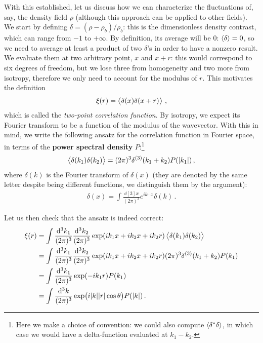 \documentclass[main.tex]{subfiles}
\begin{document}
With this established, let us discuss how we can characterize the fluctuations of, say, the density field \(\rho \) (although this approach can be applied to other fields). 
We start by defining \(\delta = (\rho - \rho_b) / \rho_b\):  this is the dimensionless density contrast, which can range from \(-1\) to \(+ \infty \).
By definition, its average will be 0: \(\expval{ \delta } = 0\), so we need to average at least a product of two \(\delta \)'s in order to have a nonzero result. 
We evaluate them at two arbitrary point, \(x\) and \(x + r\): this would correspond to six degrees of freedom, but we lose three from homogeneity and two more from isotropy, therefore we only need to account for the modulus of \(r\). This motivates the definition 
%
\begin{align}
\xi (r) = \expval{ \delta (x) \delta (x+r)} 
\,,
\end{align}
%
which is called the \emph{two-point correlation function}.
By isotropy, we expect its Fourier transform to be a function of the modulus of the wavevector.
With this in mind, we write the following ansatz for the correlation function in Fourier space, in terms of the \textbf{power spectral density} \(P\):\footnote{Here we make a choice of convention: we could also compute \(\expval{ \delta^{*} \delta }\), in which case we would have a delta-function evaluated at \(k_1 - k_2 \). }
%
\begin{align}
\expval{ \delta (k_1 ) \delta (k_2)} = (2 \pi )^3 \delta^{(3)}(k_1 + k_2 ) P(\abs{k_1 })
\,,
\end{align}
%
where \(\delta (k)\) is the Fourier transform of \(\delta (x)\) (they are denoted by the same letter despite being different functions, we distinguish them by the argument): 
%
\begin{align}
\delta (x) = \int \frac{ \dd[3]{x}}{(2 \pi )^3} e^{i k \cdot x} \delta (k)
\,.
\end{align}
% 

Let us then check that the ansatz is indeed correct:
%
\begin{align}
\xi (r) &= \int 
\frac{ \dd[3]{k_1}}{(2 \pi )^3} 
\frac{ \dd[3]{k_2}}{(2 \pi )^3} 
\exp(i k_1 x + i k_2 x + i k_2 r)
\expval{ \delta (k_1 ) \delta (k_2 )}  \\
&= \int 
\frac{ \dd[3]{k_1}}{(2 \pi )^3} 
\frac{ \dd[3]{k_2}}{(2 \pi )^3} 
\exp(i k_1 x + i k_2 x + i k_2 r)
(2 \pi )^3 \delta^{(3)} (k_1 + k_2 ) P(k_1 )  \\
&= \int 
\frac{\dd[3]{k_1}}{(2 \pi )^3}
\exp(- i k_1  r)
P(k_1 )   \\
&=
\int \frac{ \dd[3]{k}}{(2 \pi )^3}
\exp(i \abs{k} \abs{r} \cos \theta )
P( \abs{k})
\,.
\end{align}
\end{document}
